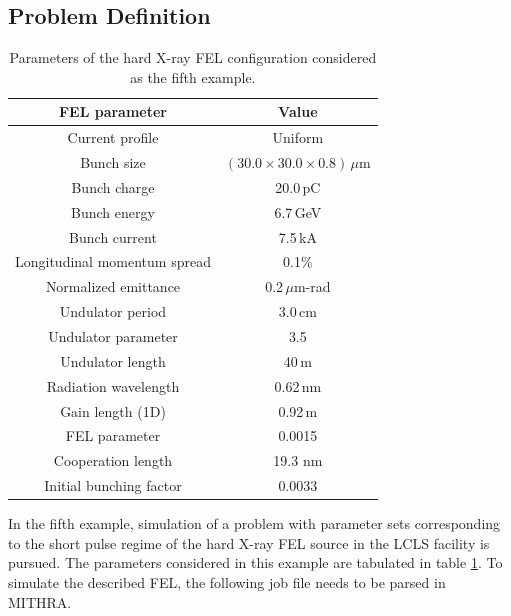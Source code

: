 \subsection{Problem Definition}

\begin{table}
	\label{example5}
	\caption{Parameters of the hard X-ray FEL configuration considered as the fifth example.}
	\centering
	{\footnotesize
	\begin{tabular}{|c||c|}
		\hline
		FEL parameter & Value \\ \hline \hline
		Current profile & Uniform \\ \hline
		Bunch size & $(30.0\times30.0\times0.8)\,\mu$m \\ \hline
		Bunch charge & 20.0\,pC \\ \hline
		Bunch energy & 6.7\,GeV \\	\hline
		Bunch current & 7.5\,kA \\ \hline
		Longitudinal momentum spread & 0.1\% \\ \hline
		Normalized emittance & 0.2\,$\mu$m-rad \\	\hline
		Undulator period & 3.0\,cm \\ \hline
		Undulator parameter & 3.5 \\ \hline
		Undulator length & 40\,m \\ \hline
		Radiation wavelength & 0.62\,nm \\ \hline
		Gain length (1D) & 0.92\,m \\ \hline
		FEL parameter & 0.0015 \\ \hline
		Cooperation length & 19.3 nm \\ \hline
		Initial bunching factor & $0.0033$ \\ \hline
	\end{tabular}
	}	
\end{table}
%
In the fifth example, simulation of a problem with parameter sets corresponding to the short pulse regime of the hard X-ray FEL source in the LCLS facility is pursued.
%
The parameters considered in this example are tabulated in table \ref{example5}.
%
To simulate the described FEL, the following job file needs to be parsed in MITHRA.
%
